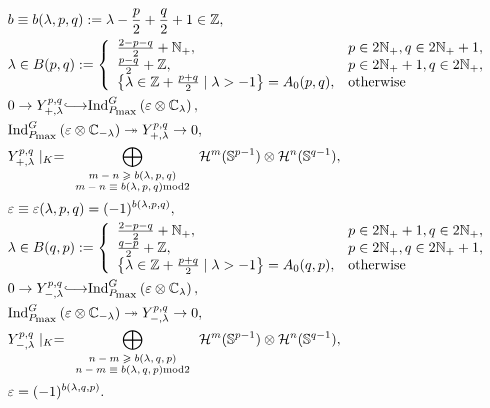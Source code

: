 \documentclass[12pt]{article} %
\theoremstyle{remark}
\newcommand{\longhookrightarrow}{{\lhook\joinrel\relbar\joinrel\rightarrow}}
\newcommand{\tmscript}[1]{ {\scriptsize #1} }
\newcommand{\assign}{:=}
\newcommand{\myInd}[1]{\mbox{Ind}_{P_{\mbox{\scriptsize\rmfamily max}}}^G\left( \varepsilon\otimes \C_{#1} \right)}
\begin{document}
\begin{eqnarray}
  & b \equiv b (\lambda, p, q) \assign \lambda - \frac{p}{2} + \frac{q}{2} +
  1 \in \mathbb{Z},  \label{eqn:20-beplus} & \\
  & \lambda \in B (p, q) \assign \left\{ \begin{array}{ll}
    \frac{2 - p - q}{2} +\mathbb{N}_+, & p \in 2\mathbb{N}_+, q \in
    2\mathbb{N}_+ + 1,\\
    \frac{p - q}{2} +\mathbb{Z}, & p \in 2\mathbb{N}_+ + 1, q \in
    2\mathbb{N}_+,\\
    \left\{ \lambda \in \mathbb{Z}+ \frac{p + q}{2} \mid \lambda > - 1
    \right\} = A_0 (p, q), & \mbox{otherwise}
  \end{array} \right. &  \nonumber\\
  & 0 \rightarrow Y_{+, \lambda}^{p, q} \longhookrightarrow
  \myInd{\lambda}, & 
  \nonumber\\
  & \myInd{-\lambda}
  \twoheadrightarrow Y_{+, \lambda}^{p, q} \rightarrow 0, &  \nonumber\\
  & Y_{+, \lambda}^{p, q} \mid_K = \displaystyle\bigoplus_{\tmscript{\begin{array}{c}
    m - n \geqslant b (\lambda, p, q)\\
    m - n \equiv b (\lambda, p, q) \mbox{mod} 2
  \end{array}}} \mathcal{H}^m (\mathbb{S}^{p - 1}) \otimes \mathcal{H}^n
  (\mathbb{S}^{q - 1}), &  \nonumber\\
  & \varepsilon \equiv \varepsilon (\lambda, p, q) = (- 1)^{b (\lambda, p,
  q)}, &  \nonumber\\
  & \lambda \in B (q, p) \assign \left\{ \begin{array}{ll}
    \frac{2 - p - q}{2} +\mathbb{N}_+, & p \in 2\mathbb{N}_+ + 1, q \in
    2\mathbb{N}_+,\\
    \frac{q - p}{2} +\mathbb{Z}, & p \in 2\mathbb{N}_+, q \in 2\mathbb{N}_+
    + 1,\\
    \left\{ \lambda \in \mathbb{Z}+ \frac{p + q}{2} \mid \lambda > - 1
    \right\} = A_0 (q, p), & \mbox{otherwise}
  \end{array} \right. &  \nonumber\\
  & 0 \rightarrow Y_{-, \lambda}^{p, q} \longhookrightarrow
  \myInd{\lambda}, &
  \nonumber\\
  & \myInd{-\lambda}
  \twoheadrightarrow Y_{-, \lambda}^{p, q} \rightarrow 0, &  \nonumber\\
  & Y_{-, \lambda}^{p, q} \mid_K = \displaystyle\bigoplus_{\tmscript{\begin{array}{c}
    n - m \geqslant b (\lambda, q, p)\\
    n - m \equiv b (\lambda, q, p) \mbox{mod} 2
  \end{array}}} \mathcal{H}^m (\mathbb{S}^{p - 1}) \otimes \mathcal{H}^n
  (\mathbb{S}^{q - 1}),  \label{eqn:20-beminus} & \\
  & \varepsilon = (- 1)^{b (\lambda, q, p)} . &  \nonumber
\end{eqnarray}
\end{document}

